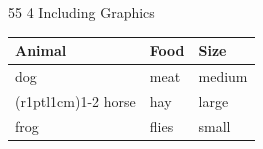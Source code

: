 \documentclass{article}
\begin{document}
55
4 Including Graphics
\begin{tabular}{@{} lll@{}} \toprule[2pt]
Animal & Food & Size \\ \midrule[1pt]
dog & meat & medium \\
\cmidrule[0.5pt](r{1pt}l{1cm}){1-2}
horse & hay & large \\
frog & flies & small \\ \bottomrule[2pt]
\end{tabular}
\end{document}
